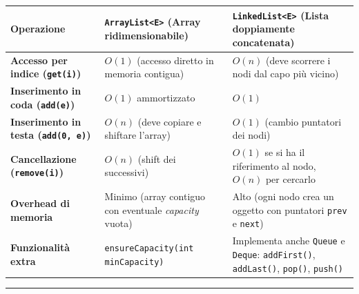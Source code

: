 \documentclass[11pt,a4paper]{article}
\newcommand{\passthrough}[1]{#1}
\begin{document}
\begin{longtable}[]{@{}
  >{\raggedright\arraybackslash}p{}
  >{\raggedright\arraybackslash}p{}
  >{\raggedright\arraybackslash}p{}@{}}
\toprule\noalign{}
\begin{minipage}[b]{\linewidth}\raggedright
Operazione
\end{minipage} & \begin{minipage}[b]{\linewidth}\raggedright
\passthrough{\lstinline!ArrayList<E>!} (Array ridimensionabile)
\end{minipage} & \begin{minipage}[b]{\linewidth}\raggedright
\passthrough{\lstinline!LinkedList<E>!} (Lista doppiamente concatenata)
\end{minipage} \\
\midrule\noalign{}
\endhead
\bottomrule\noalign{}
\endlastfoot
\textbf{Accesso per indice (\passthrough{\lstinline!get(i)!})} &
\textbf{\(O(1)\)} (accesso diretto in memoria contigua) &
\textbf{\(O(n)\)} (deve scorrere i nodi dal capo più vicino) \\
\textbf{Inserimento in coda (\passthrough{\lstinline!add(e)!})} &
\textbf{\(O(1)\)} ammortizzato & \textbf{\(O(1)\)} \\
\textbf{Inserimento in testa (\passthrough{\lstinline!add(0, e)!})} &
\textbf{\(O(n)\)} (deve copiare e shiftare l'array) & \textbf{\(O(1)\)}
(cambio puntatori dei nodi) \\
\textbf{Cancellazione (\passthrough{\lstinline!remove(i)!})} &
\textbf{\(O(n)\)} (shift dei successivi) & \textbf{\(O(1)\)} se si ha il
riferimento al nodo, \(O(n)\) per cercarlo \\
\textbf{Overhead di memoria} & Minimo (array contiguo con eventuale
\emph{capacity} vuota) & Alto (ogni nodo crea un oggetto con puntatori
\passthrough{\lstinline!prev!} e \passthrough{\lstinline!next!}) \\
\textbf{Funzionalità extra} &
\passthrough{\lstinline!ensureCapacity(int minCapacity)!} & Implementa
anche \passthrough{\lstinline!Queue!} e \passthrough{\lstinline!Deque!}:
\passthrough{\lstinline!addFirst()!},
\passthrough{\lstinline!addLast()!}, \passthrough{\lstinline!pop()!},
\passthrough{\lstinline!push()!} \\
\end{longtable}

\begin{center}\rule{0.5\linewidth}{0.5pt}\end{center}
\end{document}
